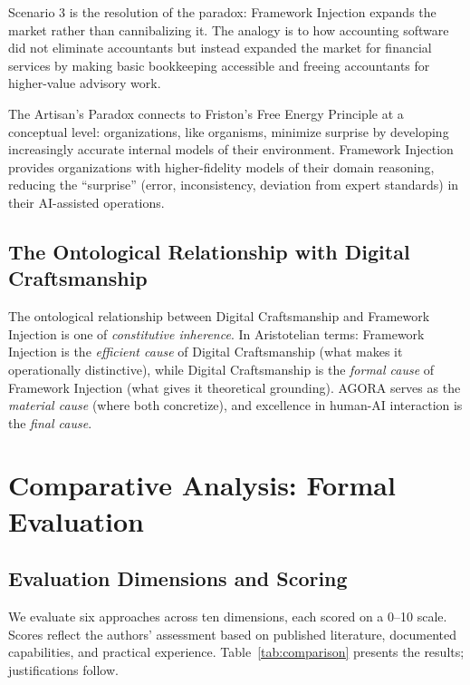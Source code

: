 \documentclass[12pt,a4paper]{article}
\begin{document}
Scenario 3 is the resolution of the paradox: Framework Injection expands the market rather than cannibalizing it. The analogy is to how accounting software did not eliminate accountants but instead expanded the market for financial services by making basic bookkeeping accessible and freeing accountants for higher-value advisory work.

The Artisan's Paradox connects to Friston's Free Energy Principle \citep{friston2010free} at a conceptual level: organizations, like organisms, minimize surprise by developing increasingly accurate internal models of their environment. Framework Injection provides organizations with higher-fidelity models of their domain reasoning, reducing the ``surprise'' (error, inconsistency, deviation from expert standards) in their AI-assisted operations.

\subsection{The Ontological Relationship with Digital Craftsmanship}
\label{sec:theory:ontology}

The ontological relationship between Digital Craftsmanship and Framework Injection is one of \emph{constitutive inherence}. In Aristotelian terms: Framework Injection is the \emph{efficient cause} of Digital Craftsmanship (what makes it operationally distinctive), while Digital Craftsmanship is the \emph{formal cause} of Framework Injection (what gives it theoretical grounding). AGORA serves as the \emph{material cause} (where both concretize), and excellence in human-AI interaction is the \emph{final cause}.


\section{Comparative Analysis: Formal Evaluation}
\label{sec:comparison}

\subsection{Evaluation Dimensions and Scoring}
\label{sec:comparison:scoring}

We evaluate six approaches across ten dimensions, each scored on a 0--10 scale. Scores reflect the authors' assessment based on published literature, documented capabilities, and practical experience. Table~\ref{tab:comparison} presents the results; justifications follow.
\end{document}
